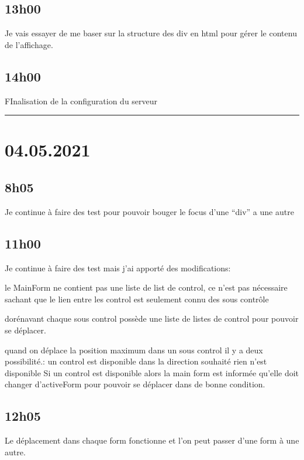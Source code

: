 \documentclass[a4paper,12pt,french]{sphinxmanual}
\begin{document}
\subsection{13h00}
\label{\detokenize{logbook:id64}}
\sphinxAtStartPar
Je vais essayer de me baser sur la structure des div en html pour gérer le contenu de l’affichage.


\subsection{14h00}
\label{\detokenize{logbook:id65}}
\sphinxAtStartPar
FInalisation de la configuration du serveur


\bigskip\hrule\bigskip



\section{04.05.2021}
\label{\detokenize{logbook:id66}}

\subsection{8h05}
\label{\detokenize{logbook:id67}}
\sphinxAtStartPar
Je continue à faire des test pour pouvoir bouger le focus d’une “div” a une autre


\subsection{11h00}
\label{\detokenize{logbook:id68}}
\sphinxAtStartPar
Je continue à faire des test mais j’ai apporté des modifications:

\sphinxAtStartPar
le MainForm ne contient pas une liste de list de control, ce n’est pas nécessaire sachant que le lien entre les control est seulement connu des sous contrôle

\sphinxAtStartPar
dorénavant chaque sous control possède une liste de listes de control pour pouvoir se déplacer.

\sphinxAtStartPar
quand on déplace la position maximum dans un sous control il y a deux possibilité.:
un control est disponible dans la direction souhaité
rien n’est disponible
Si un control est disponible alors la main form est informée qu’elle doit changer d’activeForm pour pouvoir se déplacer dans de bonne condition.


\subsection{12h05}
\label{\detokenize{logbook:id69}}
\sphinxAtStartPar
Le déplacement dans chaque form fonctionne et l’on peut passer d’une form à une autre.
\end{document}
